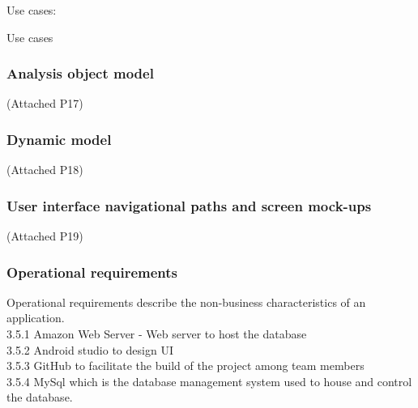 \documentclass[12pt]{article}
\begin{document}
\newpage
Use cases:

\newpage
Use cases

		
\newpage
\subsubsection{Analysis object model}
(Attached P17)
\subsubsection{Dynamic model}
(Attached P18)
	
\subsubsection{User interface navigational paths and screen mock-ups} 
(Attached P19)
\subsubsection{Operational requirements}
Operational requirements describe the non-business characteristics of an application.\\
3.5.1 Amazon Web Server - Web server to host the database\\ 
3.5.2 Android studio to design UI\\
3.5.3 GitHub to facilitate the build of the project among team members\\
3.5.4 MySql which is the database management system used to house and control the database.\\
\end{document}
